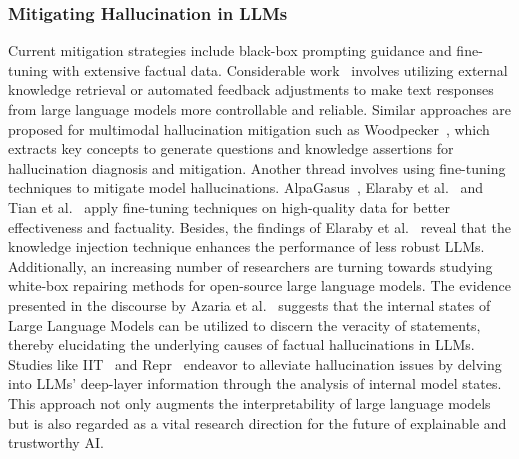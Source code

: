 \subsubsection*{\textbf{Mitigating Hallucination in LLMs}}
Current mitigation strategies include black-box prompting guidance and fine-tuning with extensive factual data. 
Considerable work~\cite{lightman2023let, varshney2023stitch,gou2023critic,vu2023freshllms} involves utilizing external knowledge retrieval or automated feedback adjustments to make text responses from large language models more controllable and reliable. 
Similar approaches are proposed for multimodal hallucination mitigation such as Woodpecker~\cite{yin2023woodpecker}, which extracts key concepts to generate questions and knowledge assertions for hallucination diagnosis and mitigation.
Another thread involves using fine-tuning techniques to mitigate model hallucinations. AlpaGasus~\cite{chen2023alpagasus}, Elaraby et al.~\cite{elaraby2023halo} and Tian et al.~\cite{tian2023fine} apply fine-tuning techniques on high-quality data for better effectiveness and factuality. 
Besides, the findings of Elaraby et al.~\cite{elaraby2023halo} reveal that the knowledge injection technique enhances the performance of less robust LLMs. 
Additionally, an increasing number of researchers are turning towards studying white-box repairing methods for open-source large language models. 
The evidence presented in the discourse by Azaria et al.~\cite{azaria2023internal} suggests that the internal states of Large Language Models can be utilized to discern the veracity of statements, thereby elucidating the underlying causes of factual hallucinations in LLMs. 
Studies like IIT~\cite{li2023inference} and Repr~\cite{zou2023representation} endeavor to alleviate hallucination issues by delving into LLMs' deep-layer information through the analysis of internal model states. 
This approach not only augments the interpretability of large language models but is also regarded as a vital research direction for the future of explainable and trustworthy AI.



